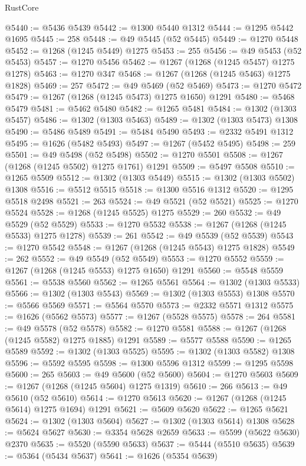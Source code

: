 \begin{lexlean}{RustCore}
\begin{coremodule}
@5440 := @5436 @5439
@5442 := @1300 @5440 @1312
@5444 := @1295 @5442 @1695
@5445 := 258
@5448 := @49 @5445 (@52 @5445)
@5449 := @1270 @5448
@5452 := @1268 (@1245 @5449) @1275
@5453 := 255
@5456 := @49 @5453 (@52 @5453)
@5457 := @1270 @5456
@5462 := @1267 (@1268 (@1245 @5457) @1275 @1278)
@5463 := @1270 @347
@5468 := @1267 (@1268 (@1245 @5463) @1275 @1828)
@5469 := 257
@5472 := @49 @5469 (@52 @5469)
@5473 := @1270 @5472
@5479 := @1267 (@1268 (@1245 @5473) @1275 @1650) @1291
@5480 := @5468 @5479
@5481 := @5462 @5480
@5482 := @1265 @5481
@5484 := @1302 (@1303 @5457)
@5486 := @1302 (@1303 @5463)
@5489 := @1302 (@1303 @5473) @1308
@5490 := @5486 @5489
@5491 := @5484 @5490
@5493 := @2332 @5491 @1312
@5495 := @1626 (@5482 @5493)
@5497 := @1267 (@5452 @5495)
@5498 := 259
@5501 := @49 @5498 (@52 @5498)
@5502 := @1270 @5501
@5508 := @1267 (@1268 (@1245 @5502) @1275 @1761) @1291
@5509 := @5497 @5508
@5510 := @1265 @5509
@5512 := @1302 (@1303 @5449)
@5515 := @1302 (@1303 @5502) @1308
@5516 := @5512 @5515
@5518 := @1300 @5516 @1312
@5520 := @1295 @5518 @2498
@5521 := 263
@5524 := @49 @5521 (@52 @5521)
@5525 := @1270 @5524
@5528 := @1268 (@1245 @5525) @1275
@5529 := 260
@5532 := @49 @5529 (@52 @5529)
@5533 := @1270 @5532
@5538 := @1267 (@1268 (@1245 @5533) @1275 @1278)
@5539 := 261
@5542 := @49 @5539 (@52 @5539)
@5543 := @1270 @5542
@5548 := @1267 (@1268 (@1245 @5543) @1275 @1828)
@5549 := 262
@5552 := @49 @5549 (@52 @5549)
@5553 := @1270 @5552
@5559 := @1267 (@1268 (@1245 @5553) @1275 @1650) @1291
@5560 := @5548 @5559
@5561 := @5538 @5560
@5562 := @1265 @5561
@5564 := @1302 (@1303 @5533)
@5566 := @1302 (@1303 @5543)
@5569 := @1302 (@1303 @5553) @1308
@5570 := @5566 @5569
@5571 := @5564 @5570
@5573 := @2332 @5571 @1312
@5575 := @1626 (@5562 @5573)
@5577 := @1267 (@5528 @5575)
@5578 := 264
@5581 := @49 @5578 (@52 @5578)
@5582 := @1270 @5581
@5588 := @1267 (@1268 (@1245 @5582) @1275 @1885) @1291
@5589 := @5577 @5588
@5590 := @1265 @5589
@5592 := @1302 (@1303 @5525)
@5595 := @1302 (@1303 @5582) @1308
@5596 := @5592 @5595
@5598 := @1300 @5596 @1312
@5599 := @1295 @5598
@5600 := 265
@5603 := @49 @5600 (@52 @5600)
@5604 := @1270 @5603
@5609 := @1267 (@1268 (@1245 @5604) @1275 @1319)
@5610 := 266
@5613 := @49 @5610 (@52 @5610)
@5614 := @1270 @5613
@5620 := @1267 (@1268 (@1245 @5614) @1275 @1694) @1291
@5621 := @5609 @5620
@5622 := @1265 @5621
@5624 := @1302 (@1303 @5604)
@5627 := @1302 (@1303 @5614) @1308
@5628 := @5624 @5627
@5630 := @3354 @5628 @2659
@5633 := @5599 (@5622 @5630) @2370
@5635 := @5520 (@5590 @5633)
@5637 := @5444 (@5510 @5635)
@5639 := @5364 (@5434 @5637)
@5641 := @1626 (@5354 @5639)

\end{coremodule}
\end{lexlean}
